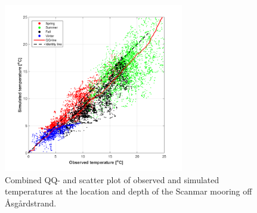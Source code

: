 \begin{figure}[htb]
	\centerline{ \includegraphics*[trim=1cm 0cm 1cm 0cm,clip=true,width=0.7\textwidth]{Figurer/Temperatur_QQ_scatter} }
	\caption{\small Combined QQ- and scatter plot of observed and simulated temperatures at the location and depth of the Scanmar mooring off {\AA}sg{\aa}rdstrand. }
	\label{fig:temp-QQ_scatter}
\end{figure}

